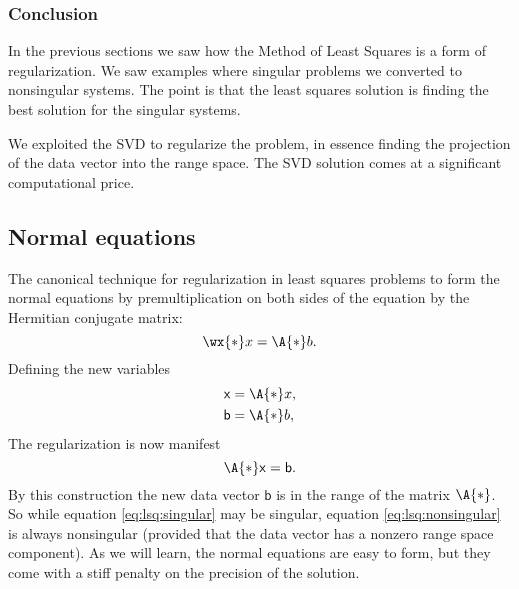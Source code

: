 \subsubsection{Conclusion}
In the previous sections we saw how the Method of Least Squares is a form of regularization. We saw examples where singular problems we converted to nonsingular systems. The point is that the least squares solution is finding the best solution for the singular systems.

We exploited the SVD to regularize the problem, in essence finding the projection of the data vector into the range space. The SVD solution comes at a significant computational price.

\subsection{Normal equations}
The canonical technique for regularization in least squares problems to form the normal equations by premultiplication on both sides of the equation by the Hermitian conjugate matrix:
\begin{equation}
  \wx{*} x = \A{*} b.
  \label{eq:lsq:singular}
\end{equation}
Defining the new variables
\begin{equation}
  \begin{split}
    \mathsf{x} &= \A{*} x , \\
    \mathsf{b} &= \A{*} b ,
  \end{split}
\end{equation}
The regularization is now manifest
\begin{equation}
  \A{*} \mathsf{x} = \mathsf{b}.
  \label{eq:lsq:nonsingular}
\end{equation}
By this construction the new data vector $\mathsf{b}$ is in the range of the matrix $\A{*}$. So while equation \eqref{eq:lsq:singular} may be singular, equation \eqref{eq:lsq:nonsingular} is always nonsingular (provided that the data vector has a nonzero range space component). As we will learn, the normal equations are easy to form, but they come with a stiff penalty on the precision of the solution.


\endinput